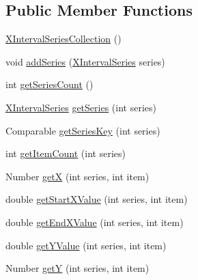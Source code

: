 \subsection*{Public Member Functions}
\begin{DoxyCompactItemize}
\item 
\mbox{\hyperlink{classorg_1_1jfree_1_1data_1_1xy_1_1_x_interval_series_collection_a7d7dbbe35aa2c703633bd26aca6ab9f5}{X\+Interval\+Series\+Collection}} ()
\item 
void \mbox{\hyperlink{classorg_1_1jfree_1_1data_1_1xy_1_1_x_interval_series_collection_aea57d489d922161bb9d56c960f69739b}{add\+Series}} (\mbox{\hyperlink{classorg_1_1jfree_1_1data_1_1xy_1_1_x_interval_series}{X\+Interval\+Series}} series)
\item 
int \mbox{\hyperlink{classorg_1_1jfree_1_1data_1_1xy_1_1_x_interval_series_collection_ad9ed84e38a8cce0df6501925618efdf7}{get\+Series\+Count}} ()
\item 
\mbox{\hyperlink{classorg_1_1jfree_1_1data_1_1xy_1_1_x_interval_series}{X\+Interval\+Series}} \mbox{\hyperlink{classorg_1_1jfree_1_1data_1_1xy_1_1_x_interval_series_collection_a8c8faf60eccaab2c360d7146925d4205}{get\+Series}} (int series)
\item 
Comparable \mbox{\hyperlink{classorg_1_1jfree_1_1data_1_1xy_1_1_x_interval_series_collection_abab4600997d3b0cb1e398f5ef12207ff}{get\+Series\+Key}} (int series)
\item 
int \mbox{\hyperlink{classorg_1_1jfree_1_1data_1_1xy_1_1_x_interval_series_collection_a54e146ea83bd2dfe56966ac098e9c502}{get\+Item\+Count}} (int series)
\item 
Number \mbox{\hyperlink{classorg_1_1jfree_1_1data_1_1xy_1_1_x_interval_series_collection_a2af637ee9454c9b23c9c61e6716eb01d}{getX}} (int series, int item)
\item 
double \mbox{\hyperlink{classorg_1_1jfree_1_1data_1_1xy_1_1_x_interval_series_collection_ae637f5eee2dc6bcf67b5c782444db397}{get\+Start\+X\+Value}} (int series, int item)
\item 
double \mbox{\hyperlink{classorg_1_1jfree_1_1data_1_1xy_1_1_x_interval_series_collection_a3bcdb47fcb343fb9e117537501457570}{get\+End\+X\+Value}} (int series, int item)
\item 
double \mbox{\hyperlink{classorg_1_1jfree_1_1data_1_1xy_1_1_x_interval_series_collection_a6443d84ede22abd2c56368b16509b076}{get\+Y\+Value}} (int series, int item)
\item 
Number \mbox{\hyperlink{classorg_1_1jfree_1_1data_1_1xy_1_1_x_interval_series_collection_ae156ad8d79e2278653592a74680ce835}{getY}} (int series, int item)

\end{DoxyCompactItemize}
